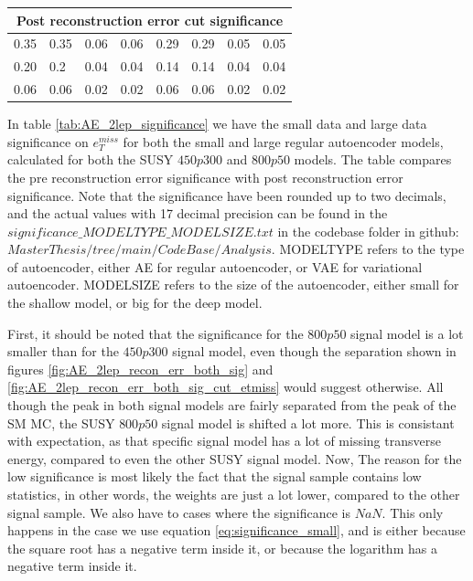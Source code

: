 \begin{table}[H]
\begin{tabular}{|llllllll|}
    \multicolumn{8}{|c|}{Post reconstruction error  cut significance}                                                                                                                         \\ \hline
    \multicolumn{1}{|l|}{0.35} & \multicolumn{1}{l|}{0.35} & \multicolumn{1}{l|}{0.06} & \multicolumn{1}{l|}{0.06} & \multicolumn{1}{l|}{0.29} & \multicolumn{1}{l|}{0.29} & \multicolumn{1}{l|}{0.05}   & \multicolumn{1}{l|}{0.05}  \\ \hline
    \multicolumn{1}{|l|}{0.20} & \multicolumn{1}{l|}{0.2} & \multicolumn{1}{l|}{0.04} & \multicolumn{1}{l|}{0.04} & \multicolumn{1}{l|}{0.14} & \multicolumn{1}{l|}{0.14} & \multicolumn{1}{l|}{0.04}   & \multicolumn{1}{l|}{0.04}  \\ \hline
    \multicolumn{1}{|l|}{0.06} & \multicolumn{1}{l|}{0.06} & \multicolumn{1}{l|}{0.02} & \multicolumn{1}{l|}{0.02} & \multicolumn{1}{l|}{0.06} & \multicolumn{1}{l|}{0.06} & \multicolumn{1}{l|}{0.02}   & \multicolumn{1}{l|}{0.02} \\ \hline
    \end{tabular}
\end{table}

In table \ref{tab:AE_2lep_significance} we have the small data and large data significance on $e_T^{miss}$ for both the small and large regular autoencoder models,
calculated for both the SUSY $450p300$ and $800p50$ models. The table compares the pre reconstruction error significance with post reconstruction error significance. 
Note that the significance have been rounded up to two decimals, and the actual values with 17 decimal precision can be found in the $significance\_MODELTYPE\_MODELSIZE.txt$ 
in the codebase folder in github: \href{https://github.com/Gadangadang/MasterThesis/tree/main/CodeBase/Analysis}{$MasterThesis/tree/main/CodeBase/Analysis$}. MODELTYPE 
refers to the type of autoencoder, either AE for regular autoencoder, or VAE for variational autoencoder. MODELSIZE refers to the size of the autoencoder, either small 
for the shallow model, or big for the deep model. \par 
First, it should be noted that the significance for the $800p50$ signal model is a lot smaller than for the $450p300$ signal model, even though the separation shown in 
figures \ref{fig:AE_2lep_recon_err_both_sig} and \ref{fig:AE_2lep_recon_err_both_sig_cut_etmiss} would suggest otherwise. All though the peak in both signal models are 
fairly separated from the peak of the SM MC, the SUSY $800p50$ signal model is shifted a lot more. This is consistant with expectation, as that specific signal model 
has a lot of missing transverse energy, compared to even the other SUSY signal model. Now, The reason for the low significance is most likely the fact that the signal sample 
contains low statistics, in other words, the weights are just a lot lower, compared to the other signal sample. We also have to cases where the significance is $NaN$. 
This only happens in the case we use equation \ref{eq:significance_small}, and is either because the square root has a negative term inside it, or because the logarithm 
has a negative term inside it. \par



